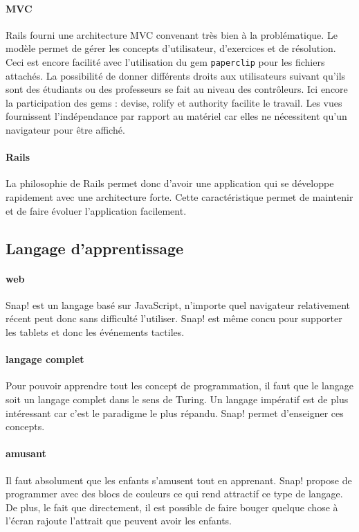 \paragraph{MVC} Rails fourni une architecture MVC convenant très bien à la problématique. Le modèle permet de gérer les concepts d'utilisateur, d'exercices et de résolution. Ceci est encore facilité avec l'utilisation du gem \texttt{paperclip} pour les fichiers attachés.  La possibilité de donner différents droits aux utilisateurs suivant qu'ils sont des étudiants ou des professeurs se fait au niveau des contrôleurs. Ici encore la participation des gems : devise, rolify et authority facilite le travail. Les vues fournissent l'indépendance par rapport au matériel car elles ne nécessitent qu'un navigateur pour être affiché.

\paragraph{Rails}La philosophie de Rails permet donc d'avoir une application qui se développe rapidement avec une architecture forte. Cette caractéristique permet de maintenir et de faire évoluer l'application facilement.




\subsection{Langage d'apprentissage}

\paragraph{web} Snap! est un langage basé sur JavaScript, n'importe quel navigateur relativement récent peut donc sans difficulté l'utiliser. Snap! est même concu pour supporter les tablets et donc les événements tactiles.
\paragraph{langage complet} Pour pouvoir apprendre tout les concept de programmation, il faut que le langage soit un langage complet dans le sens de Turing. Un langage impératif est de plus intéressant car c'est le paradigme le plus répandu. Snap! permet d'enseigner ces concepts.
\paragraph{amusant} Il faut absolument que les enfants s'amusent tout en apprenant. Snap! propose de programmer avec des blocs de couleurs ce qui rend attractif ce type de langage. De plus, le fait que directement, il est possible de faire bouger quelque chose à l'écran rajoute l'attrait que peuvent avoir les enfants.

